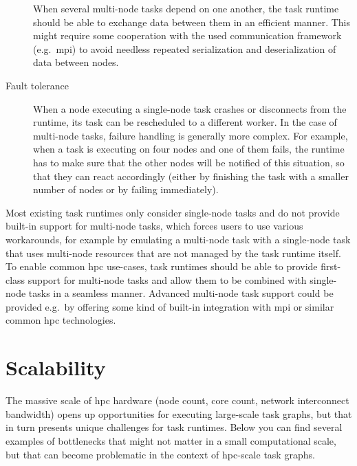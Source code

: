 \begin{description}
    When several multi-node tasks depend on one another, the task runtime should be able to exchange
    data between them in an efficient manner. This might require some cooperation with the used
    communication framework (e.g.\ \gls{mpi}) to avoid needless repeated serialization
    and deserialization of data between nodes.
    \item[Fault tolerance] When a node executing a single-node task crashes or disconnects from the runtime, its task can be
    rescheduled to a different worker. In the case of multi-node tasks, failure handling is generally
    more complex. For example, when a task is executing on four nodes and one of them fails, the
    runtime has to make sure that the other nodes will be notified of this situation, so that they can
    react accordingly (either by finishing the task with a smaller number of nodes or by failing
    immediately).
\end{description}

Most existing task runtimes only consider single-node tasks and do not provide built-in support for
multi-node tasks, which forces users to use various workarounds, for example by emulating a
multi-node task with a single-node task that uses multi-node resources that are not managed by the
task runtime itself. To enable common \gls{hpc} use-cases, task runtimes should
be able to provide first-class support for multi-node tasks and allow them to be combined with
single-node tasks in a seamless manner. Advanced multi-node task support could be provided e.g.\ by
offering some kind of built-in integration with \gls{mpi} or similar common
\gls{hpc} technologies.

\section{Scalability}
The massive scale of \gls{hpc} hardware (node count, core count, network
interconnect bandwidth) opens up opportunities for executing large-scale task graphs, but that in
turn presents unique challenges for task runtimes. Below you can find several examples of
bottlenecks that might not matter in a small computational scale, but that can become problematic
in the context of \gls{hpc}-scale task graphs.

